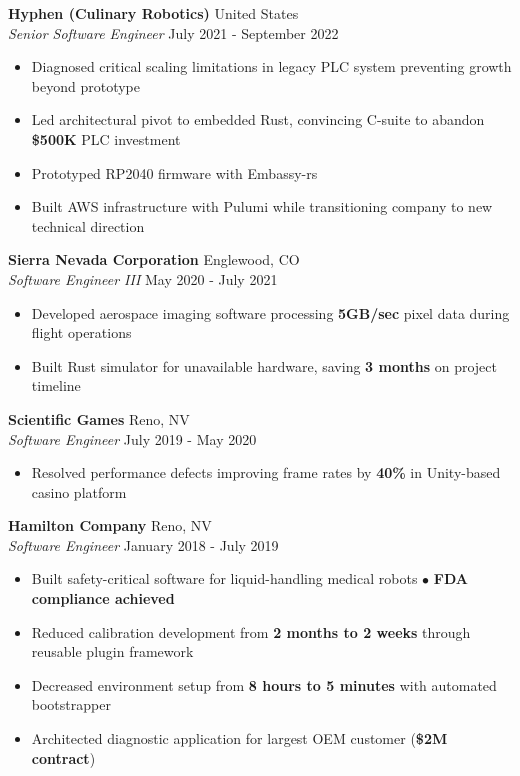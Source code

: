 \documentclass[a4paper]{article}
\begin{document}
\textbf{Hyphen (Culinary Robotics)} \hfill United States\\
\textit{Senior Software Engineer} \hfill July 2021 - September 2022\\
\vspace{-1mm}
\begin{itemize} \itemsep 1pt
    \item Diagnosed critical scaling limitations in legacy PLC system preventing growth beyond prototype
    \item Led architectural pivot to embedded Rust, convincing C-suite to abandon \textbf{\$500K} PLC investment
    \item Prototyped RP2040 firmware with Embassy-rs
    \item Built AWS infrastructure with Pulumi while transitioning company to new technical direction
\end{itemize}

\textbf{Sierra Nevada Corporation} \hfill Englewood, CO\\
\textit{Software Engineer III} \hfill May 2020 - July 2021\\
\vspace{-1mm}
\begin{itemize} \itemsep 1pt
    \item Developed aerospace imaging software processing \textbf{5GB/sec} pixel data during flight operations
    \item Built Rust simulator for unavailable hardware, saving \textbf{3 months} on project timeline
\end{itemize}

\textbf{Scientific Games} \hfill Reno, NV\\
\textit{Software Engineer} \hfill July 2019 - May 2020\\
\vspace{-1mm}
\begin{itemize} \itemsep 1pt
    \item Resolved performance defects improving frame rates by \textbf{40\%} in Unity-based casino platform
\end{itemize}

\textbf{Hamilton Company} \hfill Reno, NV\\
\textit{Software Engineer} \hfill January 2018 - July 2019\\
\vspace{-1mm}
\begin{itemize} \itemsep 1pt
    \item Built safety-critical software for liquid-handling medical robots $\bullet$ \textbf{FDA compliance achieved}
    \item Reduced calibration development from \textbf{2 months to 2 weeks} through reusable plugin framework
    \item Decreased environment setup from \textbf{8 hours to 5 minutes} with automated bootstrapper
    \item Architected diagnostic application for largest OEM customer (\textbf{\$2M contract})
\end{itemize}
\end{document}
